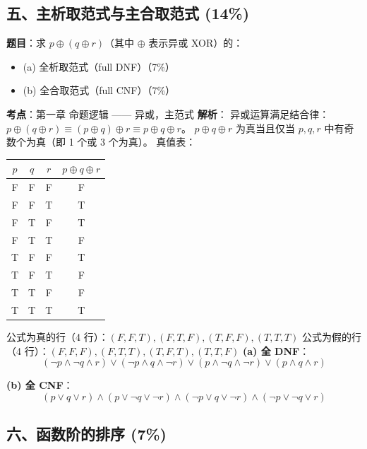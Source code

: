 \documentclass[10pt,a4paper,openany]{ctexbook}
\theoremstyle{definition}
\theoremstyle{remark}
\begin{document}
\vspace{-2pt}

\subsection{五、主析取范式与主合取范式 (14\%)}

\textbf{题目}：求 $p \oplus (q \oplus r)$（其中 $\oplus$ 表示异或 XOR）的：
\begin{itemize}
\item (a) 全析取范式（full DNF）（7\%）
\item (b) 全合取范式（full CNF）（7\%）

\end{itemize}

\textbf{考点}：第一章 命题逻辑 —— 异或，主范式
\textbf{解析}：
异或运算满足结合律：$p \oplus (q \oplus r) \equiv (p \oplus q) \oplus r \equiv p \oplus q \oplus r$。
$p \oplus q \oplus r$ 为真当且仅当 $p, q, r$ 中有奇数个为真（即 1 个或 3 个为真）。
真值表：
\begin{center}
\begin{tabular}{cccc}
\hline
$p$ & $q$ & $r$ & $p \oplus q \oplus r$ \\ \hline
F & F & F & F \\
F & F & T & T \\
F & T & F & T \\
F & T & T & F \\
T & F & F & T \\
T & F & T & F \\
T & T & F & F \\
T & T & T & T \\
\hline
\end{tabular}

\end{center}

公式为真的行（4 行）：$(F,F,T), (F,T,F), (T,F,F), (T,T,T)$
公式为假的行（4 行）：$(F,F,F), (F,T,T), (T,F,T), (T,T,F)$
\textbf{(a) 全 DNF}：
\[
(\neg p \land \neg q \land r) \lor (\neg p \land q \land \neg r) \lor (p \land \neg q \land \neg r) \lor (p \land q \land r)
\]

\textbf{(b) 全 CNF}：
\[
(p \lor q \lor r) \land (p \lor \neg q \lor \neg r) \land (\neg p \lor q \lor \neg r) \land (\neg p \lor \neg q \lor r)
\]

\vspace{-2pt}

\subsection{六、函数阶的排序 (7\%)}
\end{document}
